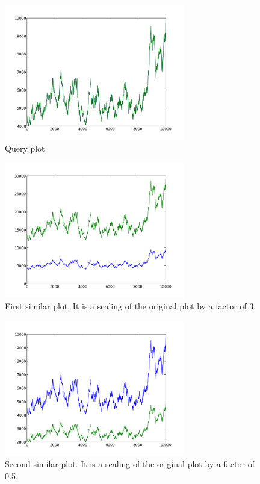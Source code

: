 \begin{figure}[h!]
    \centering
    \includegraphics[width=0.7\textwidth]{images/query.png}
    \caption{Query plot}
    \label{fig:query}
\end{figure}

\begin{figure}[h!]
    \centering
    \includegraphics[width=0.7\textwidth]{images/mutant_1.png}
    \caption{First similar plot.  It is a scaling of the original plot by a factor of 3.}
    \label{fig:mutant_1}
\end{figure}

\begin{figure}[h!]
    \centering
    \includegraphics[width=0.7\textwidth]{images/mutant_2.png}
    \caption{Second similar plot.  It is a scaling of the original plot by a factor of 0.5.}
    \label{fig:mutant_2}
\end{figure}

